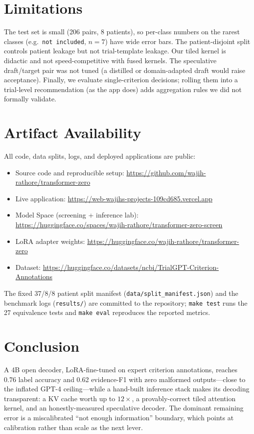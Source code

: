 \documentclass[conference]{IEEEtran}
\begin{document}
\section{Limitations}
The test set is small (206 pairs, 8 patients), so per-class numbers on the rarest
classes (e.g.\ \texttt{not included}, $n{=}7$) have wide error bars. The
patient-disjoint split controls patient leakage but not trial-template leakage.
Our tiled kernel is didactic and not speed-competitive with fused kernels. The
speculative draft/target pair was not tuned (a distilled or domain-adapted draft
would raise acceptance). Finally, we evaluate single-criterion decisions; rolling
them into a trial-level recommendation (as the app does) adds aggregation rules we
did not formally validate.

\section{Artifact Availability}
All code, data splits, logs, and deployed applications are public:
\begin{itemize}
\item Source code and reproducible setup: \url{https://github.com/wajih-rathore/transformer-zero}
\item Live application: \url{https://web-wajihs-projects-109cd685.vercel.app}
\item Model Space (screening + inference lab): \url{https://huggingface.co/spaces/wajih-rathore/transformer-zero-screen}
\item LoRA adapter weights: \url{https://huggingface.co/wajih-rathore/transformer-zero}
\item Dataset: \url{https://huggingface.co/datasets/ncbi/TrialGPT-Criterion-Annotations}
\end{itemize}
The fixed 37/8/8 patient split manifest (\texttt{data/split\_manifest.json}) and the
benchmark logs (\texttt{results/}) are committed to the repository; \texttt{make test}
runs the 27 equivalence tests and \texttt{make eval} reproduces the reported metrics.

\section{Conclusion}
A 4B open decoder, LoRA-fine-tuned on expert criterion annotations, reaches 0.76
label accuracy and 0.62 evidence-F1 with zero malformed outputs---close to the
inflated GPT-4 ceiling---while a hand-built inference stack makes its decoding
transparent: a KV cache worth up to $12\times$, a provably-correct tiled attention
kernel, and an honestly-measured speculative decoder. The dominant remaining error
is a miscalibrated ``not enough information'' boundary, which points at calibration
rather than scale as the next lever.
\end{document}
